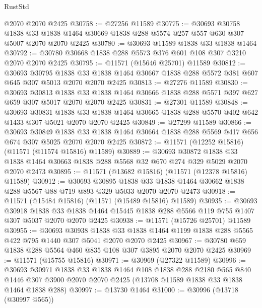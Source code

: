 \begin{lexlean}{RustStd}
\begin{coremodule}
    @2070
    @2070
    @2425
@30758 := @27256 @11589
@30775 := @30693
    @30758
    @1838
    @33
    @1838
    @1464
    @30669
    @1838
    @288
    @5574
    @257
    @557
    @630
    @307
    @5007
    @2070
    @2070
    @2425
@30780 := @30693 @11589 @1838 @33 @1838 @1464
@30792 := @30780 @30668 @1838 @288 @5573 @376 @601 @108 @307 @3210 @2070 @2070 @2425
@30795 := @11571 (@15646 @25701) @11589
@30812 := @30693
    @30795
    @1838
    @33
    @1838
    @1464
    @30667
    @1838
    @288
    @5572
    @381
    @607
    @645
    @307
    @5013
    @2070
    @2070
    @2425
@30813 := @27276 @11589
@30830 := @30693
    @30813
    @1838
    @33
    @1838
    @1464
    @30666
    @1838
    @288
    @5571
    @397
    @627
    @659
    @307
    @5017
    @2070
    @2070
    @2425
@30831 := @27301 @11589
@30848 := @30693
    @30831
    @1838
    @33
    @1838
    @1464
    @30665
    @1838
    @288
    @5570
    @402
    @642
    @1433
    @307
    @5021
    @2070
    @2070
    @2425
@30849 := @27299 @11589
@30866 := @30693
    @30849
    @1838
    @33
    @1838
    @1464
    @30664
    @1838
    @288
    @5569
    @417
    @656
    @674
    @307
    @5025
    @2070
    @2070
    @2425
@30872 := @11571 (@12252 @15816) (@11571 (@11574 @15816) @11589)
@30889 := @30693
    @30872
    @1838
    @33
    @1838
    @1464
    @30663
    @1838
    @288
    @5568
    @32
    @670
    @274
    @329
    @5029
    @2070
    @2070
    @2473
@30895 := @11571 (@13682 @15816) (@11571 (@12378 @15816) @11589)
@30912 := @30693
    @30895
    @1838
    @33
    @1838
    @1464
    @30662
    @1838
    @288
    @5567
    @88
    @719
    @893
    @329
    @5033
    @2070
    @2070
    @2473
@30918 := @11571 (@15484 @15816) (@11571 (@15489 @15816) @11589)
@30935 := @30693
    @30918
    @1838
    @33
    @1838
    @1464
    @15445
    @1838
    @288
    @5566
    @119
    @755
    @1407
    @307
    @5037
    @2070
    @2070
    @2425
@30938 := @11571 (@15726 @25701) @11589
@30955 := @30693
    @30938
    @1838
    @33
    @1838
    @1464
    @1199
    @1838
    @288
    @5565
    @422
    @795
    @1440
    @307
    @5041
    @2070
    @2070
    @2425
@30967 := @30780 @659 @1838 @288 @5564 @460 @835 @108 @307 @3895 @2070 @2070 @2425
@30969 := @11571 (@15755 @15816)
@30971 := @30969 (@27322 @11589)
@30996 := @30693
    @30971
    @1838
    @33
    @1838
    @1464
    @108
    @1838
    @288
    @2180
    @565
    @840
    @1446
    @307
    @3900
    @2070
    @2070
    @2425
    (@13708 @11589 @1838 @33 @1838 @1464 @1838 @288)
@30997 := @13730 @1464
@31000 := @30996 (@13718 (@30997 @565))

\end{coremodule}
\end{lexlean}
